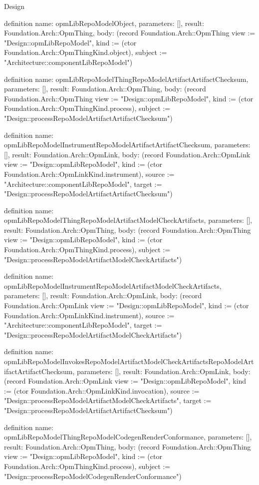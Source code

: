 \begin{lexlean}{Design}
\begin{semanticmodule}
definition{
  name: opmLibRepoModelObject,
  parameters: [],
  result: Foundation.Arch::OpmThing,
  body: (record Foundation.Arch::OpmThing {view := "Design::opmLibRepoModel", kind := (ctor Foundation.Arch::OpmThingKind.object), subject := "Architecture::componentLibRepoModel"})
}

definition{
  name: opmLibRepoModelThingRepoModelArtifactArtifactChecksum,
  parameters: [],
  result: Foundation.Arch::OpmThing,
  body: (record Foundation.Arch::OpmThing {view := "Design::opmLibRepoModel", kind := (ctor Foundation.Arch::OpmThingKind.process), subject := "Design::processRepoModelArtifactArtifactChecksum"})
}

definition{
  name: opmLibRepoModelInstrumentRepoModelArtifactArtifactChecksum,
  parameters: [],
  result: Foundation.Arch::OpmLink,
  body: (record Foundation.Arch::OpmLink {view := "Design::opmLibRepoModel", kind := (ctor Foundation.Arch::OpmLinkKind.instrument), source := "Architecture::componentLibRepoModel", target := "Design::processRepoModelArtifactArtifactChecksum"})
}

definition{
  name: opmLibRepoModelThingRepoModelArtifactModelCheckArtifacts,
  parameters: [],
  result: Foundation.Arch::OpmThing,
  body: (record Foundation.Arch::OpmThing {view := "Design::opmLibRepoModel", kind := (ctor Foundation.Arch::OpmThingKind.process), subject := "Design::processRepoModelArtifactModelCheckArtifacts"})
}

definition{
  name: opmLibRepoModelInstrumentRepoModelArtifactModelCheckArtifacts,
  parameters: [],
  result: Foundation.Arch::OpmLink,
  body: (record Foundation.Arch::OpmLink {view := "Design::opmLibRepoModel", kind := (ctor Foundation.Arch::OpmLinkKind.instrument), source := "Architecture::componentLibRepoModel", target := "Design::processRepoModelArtifactModelCheckArtifacts"})
}

definition{
  name: opmLibRepoModelInvokesRepoModelArtifactModelCheckArtifactsRepoModelArtifactArtifactChecksum,
  parameters: [],
  result: Foundation.Arch::OpmLink,
  body: (record Foundation.Arch::OpmLink {view := "Design::opmLibRepoModel", kind := (ctor Foundation.Arch::OpmLinkKind.invocation), source := "Design::processRepoModelArtifactModelCheckArtifacts", target := "Design::processRepoModelArtifactArtifactChecksum"})
}

definition{
  name: opmLibRepoModelThingRepoModelCodegenRenderConformance,
  parameters: [],
  result: Foundation.Arch::OpmThing,
  body: (record Foundation.Arch::OpmThing {view := "Design::opmLibRepoModel", kind := (ctor Foundation.Arch::OpmThingKind.process), subject := "Design::processRepoModelCodegenRenderConformance"})
}


\end{semanticmodule}
\end{lexlean}
